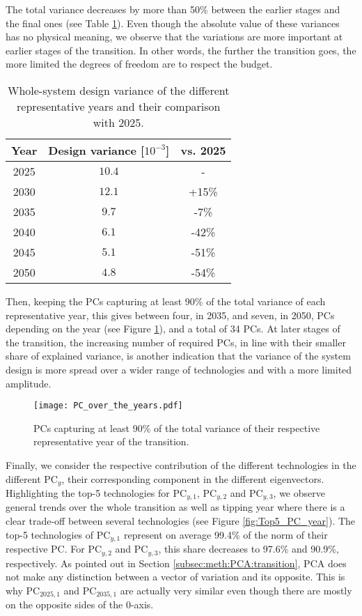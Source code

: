 The total variance decreases by more than 50\% between the earlier stages and the final ones (see Table \ref{tab:design_variance}). Even though the absolute value of these variances has no physical meaning, we observe that the variations are more important at earlier stages of the transition. In other words, the further the transition goes, the more limited the degrees of freedom are to respect the  budget.

\begin{table}[htbp]
\caption{Whole-system design variance of the different representative years and their comparison with 2025.} 
\label{tab:design_variance}
\centering
\begin{tabular}{c c c}
\toprule
\textbf{Year}      & \textbf{Design variance} [$10^{-3}$]	 &	\textbf{vs. 2025}\\
\midrule
2025 	&	$10.4$	& - 	\\
2030 	&	$12.1$	& +15\%	\\
2035 	&	$9.7$	& -7\% 	\\
2040 	&	$6.1$	& -42\% 	\\
2045 	&	$5.1$	& -51\% 	\\
2050 	&	$4.8$	& -54\% 	\\
\bottomrule
\end{tabular}
\end{table}

Then, keeping the \gls{PCs} capturing at least 90\% of the total variance of each representative year, this gives between four, in 2035, and seven, in 2050, \gls{PCs} depending on the year (see Figure \ref{fig:PC_over_the_years}), and a total of 34 \gls{PCs}. At later stages of the transition, the increasing number of required \gls{PCs}, in line with their smaller share of explained variance, is another indication that the variance of the system design is more spread over a wider range of technologies and with a more limited amplitude. 

\begin{figure}[!htbp]
\centering
\texttt{[image: PC\_over\_the\_years.pdf]}
\caption{\gls{PCs} capturing at least 90\% of the total variance of their respective representative year of the transition. }
\label{fig:PC_over_the_years}
\end{figure}

Finally, we consider the respective contribution of the different technologies in the different $\text{PC}_{y}$, \ie their corresponding component in the different eigenvectors. Highlighting the top-5 technologies for $\text{PC}_{y,1}$, $\text{PC}_{y,2}$ and $\text{PC}_{y,3}$, we observe general trends over the whole transition as well as tipping year where there is a clear trade-off between several technologies (see Figure \ref{fig:Top5_PC_year}). The top-5 technologies of $\text{PC}_{y,1}$ represent on average 99.4\% of the norm of their respective PC. For $\text{PC}_{y,2}$ and $\text{PC}_{y,3}$, this share decreases to 97.6\% and 90.9\%, respectively.  As pointed out in Section \ref{subsec:meth:PCA:transition}, \gls{PCA} does not make any distinction between a vector of variation and its opposite. This is why $\text{PC}_{2025,1}$ and $\text{PC}_{2035,1}$ are actually very similar even though there are mostly on the opposite sides of the 0-axis.


